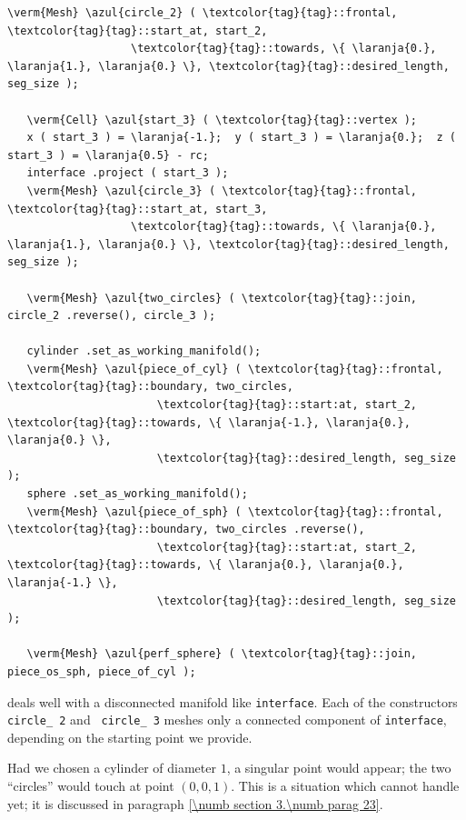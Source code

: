 \begin{Verbatim}[commandchars=\\\{\},formatcom=\small\tt,frame=single,
   label=parag-\ref{\numb section 3.\numb parag 20}.cpp,rulecolor=\color{moldura},
   baselinestretch=0.94,framesep=2mm                                              ]
   \verm{Mesh} \azul{circle_2} ( \textcolor{tag}{tag}::frontal, \textcolor{tag}{tag}::start_at, start_2,
                   \textcolor{tag}{tag}::towards, \{ \laranja{0.}, \laranja{1.}, \laranja{0.} \}, \textcolor{tag}{tag}::desired_length, seg_size );

   \verm{Cell} \azul{start_3} ( \textcolor{tag}{tag}::vertex );
   x ( start_3 ) = \laranja{-1.};  y ( start_3 ) = \laranja{0.};  z ( start_3 ) = \laranja{0.5} - rc;
   interface .project ( start_3 );
   \verm{Mesh} \azul{circle_3} ( \textcolor{tag}{tag}::frontal, \textcolor{tag}{tag}::start_at, start_3,
                   \textcolor{tag}{tag}::towards, \{ \laranja{0.}, \laranja{1.}, \laranja{0.} \}, \textcolor{tag}{tag}::desired_length, seg_size );

   \verm{Mesh} \azul{two_circles} ( \textcolor{tag}{tag}::join, circle_2 .reverse(), circle_3 );

   cylinder .set_as_working_manifold();
   \verm{Mesh} \azul{piece_of_cyl} ( \textcolor{tag}{tag}::frontal, \textcolor{tag}{tag}::boundary, two_circles,
                       \textcolor{tag}{tag}::start:at, start_2, \textcolor{tag}{tag}::towards, \{ \laranja{-1.}, \laranja{0.}, \laranja{0.} \},
                       \textcolor{tag}{tag}::desired_length, seg_size                         );
   sphere .set_as_working_manifold();
   \verm{Mesh} \azul{piece_of_sph} ( \textcolor{tag}{tag}::frontal, \textcolor{tag}{tag}::boundary, two_circles .reverse(),
                       \textcolor{tag}{tag}::start:at, start_2, \textcolor{tag}{tag}::towards, \{ \laranja{0.}, \laranja{0.}, \laranja{-1.} \},
                       \textcolor{tag}{tag}::desired_length, seg_size                         );

   \verm{Mesh} \azul{perf_sphere} ( \textcolor{tag}{tag}::join, piece_os_sph, piece_of_cyl );
\end{Verbatim}

{\ManiFEM} deals well with a disconnected manifold like {\small\tt interface}.
Each of the constructors {\small\tt{} circle\_\,2} and {\small\tt{} circle\_\,3}
meshes only a connected component of {\small\tt interface}, depending on the starting point
we provide.

Had we chosen a cylinder of diameter $1$, a singular point would appear;
the two ``circles'' would touch at point $ (0,0,1) $.
This is a situation which {\maniFEM} cannot handle yet; it is discussed in paragraph
\ref{\numb section 3.\numb parag 23}.


